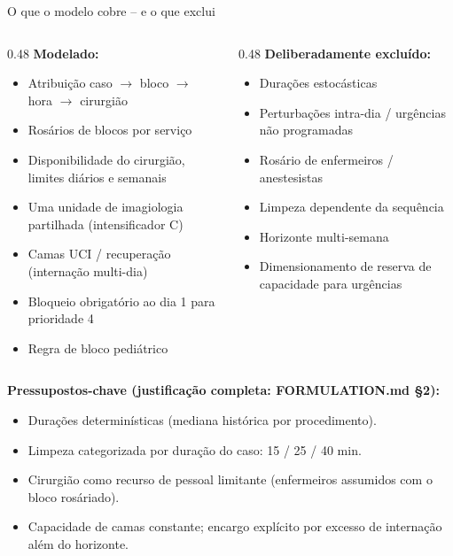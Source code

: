 \documentclass[10pt,aspectratio=169]{beamer}
\begin{document}
\begin{frame}{O que o modelo cobre -- e o que exclui}
  \begin{columns}
    \begin{column}{0.48\textwidth}
      \textbf{Modelado:}
      \begin{itemize}\footnotesize
        \item Atribui\c{c}\~ao caso $\to$ bloco $\to$ hora $\to$ cirurgi\~ao
        \item Ros\'arios de blocos por servi\c{c}o
        \item Disponibilidade do cirurgi\~ao, limites di\'arios e semanais
        \item Uma unidade de imagiologia partilhada (intensificador C)
        \item Camas UCI / recupera\c{c}\~ao (interna\c{c}\~ao multi-dia)
        \item Bloqueio obrigat\'orio ao dia 1 para prioridade 4
        \item Regra de bloco pedi\'atrico
      \end{itemize}
    \end{column}
    \begin{column}{0.48\textwidth}
      \textbf{Deliberadamente exclu\'ido:}
      \begin{itemize}\footnotesize
        \item Dura\c{c}\~oes estoc\'asticas
        \item Perturba\c{c}\~oes intra-dia / urg\^encias n\~ao programadas
        \item Ros\'ario de enfermeiros / anestesistas
        \item Limpeza dependente da sequ\^encia
        \item Horizonte multi-semana
        \item Dimensionamento de reserva de capacidade para urg\^encias
      \end{itemize}
    \end{column}
  \end{columns}
  \vspace{0.5em}
  \textbf{Pressupostos-chave (justifica\c{c}\~ao completa: FORMULATION.md \S2):}
  \begin{itemize}\footnotesize
    \item Dura\c{c}\~oes determin\'isticas (mediana hist\'orica por procedimento).
    \item Limpeza categorizada por dura\c{c}\~ao do caso: 15 / 25 / 40 min.
    \item Cirurgi\~ao como recurso de pessoal limitante (enfermeiros
      assumidos com o bloco ros\'ariado).
    \item Capacidade de camas constante; encargo expl\'icito por excesso
      de interna\c{c}\~ao al\'em do horizonte.
  \end{itemize}
\end{frame}
\end{document}
